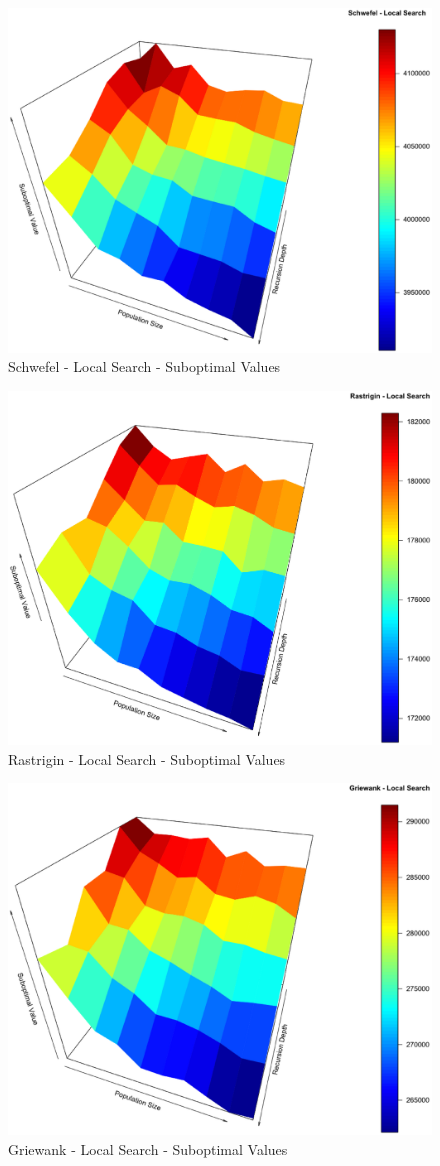 \documentclass{svproc}
\begin{document}
\begin{figure}[tbp]
\centering
\includegraphics[width=1.0\hsize,height=0.65\hsize]{fig09.eps}
\caption{Schwefel - Local Search - Suboptimal Values}
\label{fig03}
\end{figure}

\begin{figure}[tbp]
\centering
\includegraphics[width=1.0\hsize,height=0.65\hsize]{fig12.eps}
\caption{Rastrigin - Local Search - Suboptimal Values}
\label{fig04}
\end{figure}

\begin{figure}[tbp]
\centering
\includegraphics[width=1.0\hsize,height=0.65\hsize]{fig15.eps}
\caption{Griewank - Local Search - Suboptimal Values}
\label{fig05}
\end{figure}
\end{document}
